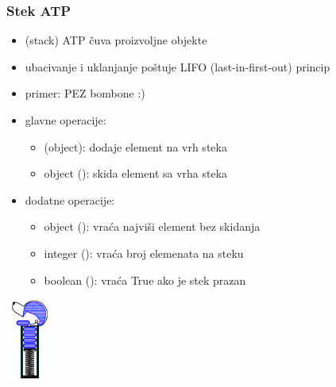 \documentclass[compress]{beamer}
\begin{document}
\begin{frame}[fragile]
  \frametitle{Stek ATP}
  \begin{itemize}
    \item {} (stack) ATP čuva proizvoljne objekte
    \item ubacivanje i uklanjanje poštuje LIFO (last-in-first-out) princip
    \item primer: PEZ bombone :)
    \item glavne operacije:
    \begin{itemize}
      \item {}(object): dodaje element na vrh steka
      \item object (): skida element sa vrha steka
    \end{itemize}
    \item dodatne operacije:
    \begin{itemize}
      \item object (): vraća najviši element bez skidanja
      \item integer (): vraća broj elemenata na steku
      \item boolean (): vraća True ako je stek prazan
    \end{itemize}
  \end{itemize}
  \begin{center}
    \includegraphics[width=1.5cm]{asp-05-pic01.png}
  \end{center}
\end{frame}
\end{document}
